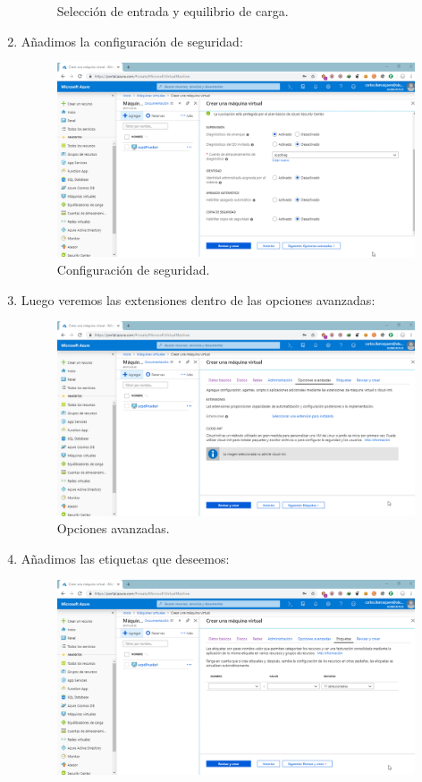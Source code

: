 \begin{enumerate}
\begin{figure}[h]
		\caption{Selección de entrada y equilibrio de carga.}
		\label{Selección de entrada y equilibrio de carga}
	\end{figure}
	\item Añadimos la configuración de seguridad:
	\begin{figure}[h]
		\centering
		\includegraphics[scale=0.35]{ImagenesAzure/7.png}
		\caption{Configuración de seguridad.}
		\label{Configuración de seguridad}
	\end{figure}
\newpage
	\item Luego veremos las extensiones dentro de las opciones avanzadas:
	\begin{figure}[h]
		\centering
		\includegraphics[scale=0.35]{ImagenesAzure/8.png}
		\caption{Opciones avanzadas.}
		\label{Opciones avanzadas}
	\end{figure}
	\item Añadimos las etiquetas que deseemos:
	\begin{figure}[h]
		\centering
		\includegraphics[scale=0.35]{ImagenesAzure/9.png}

\end{figure}
\end{enumerate}
